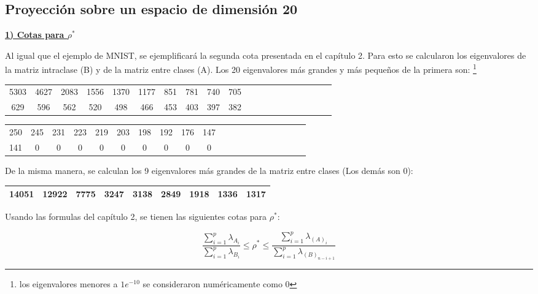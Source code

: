 \pagebreak
\subsection{Proyección sobre un espacio de dimensión 20}

\underline{\textbf{1) Cotas para $\rho^*$}}

Al igual que el ejemplo de MNIST, se ejemplificará la segunda cota presentada en el capítulo 2. Para esto se calcularon los eigenvalores de la matriz intraclase (B) y de la matriz entre clases (A). Los 20 eigenvalores más grandes y más pequeños de la primera son: \footnote{los eigenvalores menores a $1e^{-10}$ se consideraron numéricamente como 0}

\begin{center}
\begin{tabular}{ | c | c|  c |c | c|  c |c | c|  c |c | c | c|  c |c | c|  c |c | c|  c |c |} 
\hline
5303 & 4627 & 2083 & 1556 & 1370 & 1177 & 851 & 781 & 740 & 705 \\
629 & 596 & 562 & 520 & 498 & 466 & 453 & 403 & 397 & 382 \\
\hline
\hline
\end{tabular}
\end{center}

\begin{center}
\begin{tabular}{ | c | c|  c |c | c|  c |c | c|  c |c | c | c|  c |c | c|  c |c | c|  c |c |} 
\hline
250 & 245 & 231 & 223 & 219 & 203 & 198 & 192 & 176 & 147 \\
141 & 0 & 0 & 0 & 0 & 0 & 0 & 0 & 0 & 0 \\
\hline
\hline
\end{tabular}
\end{center}

De la misma manera, se calculan los 9 eigenvalores más grandes de la matriz entre clases (Los demás son 0):

\begin{center}
\begin{tabular}{ | c | c|  c |c | c|  c |c | c|  c |} 
\hline
14051 & 12922 & 7775 & 3247 & 3138 & 2849 & 1918 & 1336 & 1317 \\
\hline
\hline
\end{tabular}
\end{center}

Usando las formulas del capítulo 2, se tienen las siguientes cotas para $\rho^*$:

\begin{equation*}
\frac{\sum_{i = 1}^{p}\lambda_{A_i}}{\sum_{i = 1}^{p}\lambda_{B_i}} \leq \rho^* \leq \frac{\sum_{i = 1}^{p}\lambda_{(A)_i}}{\sum_{i = 1}^{p}\lambda_{(B)_{n-i+1}}}  
\end{equation*}

